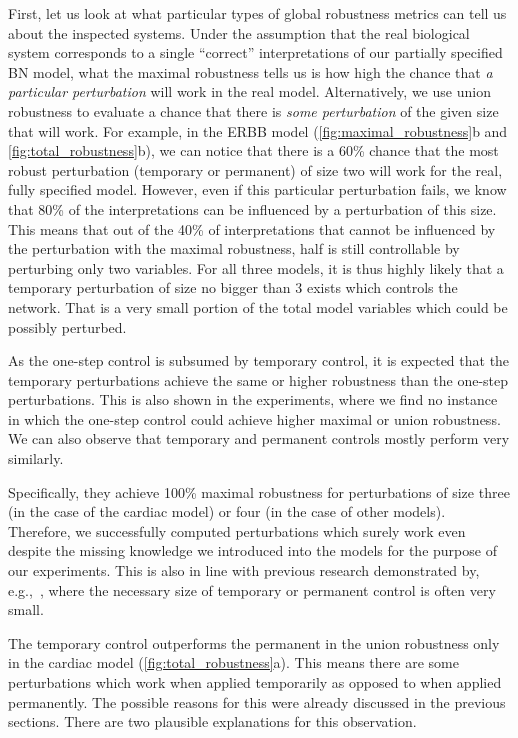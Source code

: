First, let us look at what particular types of global robustness metrics can tell us about the inspected systems. Under the assumption that the real biological system corresponds to a single ``correct'' interpretations of our partially specified BN model, what the maximal robustness tells us is how high the chance that \emph{a particular perturbation} will work in the real model. Alternatively, we use union robustness to evaluate a chance that there is \emph{some perturbation} of the given size that will work. For example, in the ERBB model (\autoref{fig:maximal_robustness}b and \autoref{fig:total_robustness}b), we can notice that there is a 60\% chance that the most robust perturbation (temporary or permanent) of size two will work for the real, fully specified model. However, even if this particular perturbation fails, we know that 80\% of the interpretations can be influenced by a perturbation of this size. This means that out of the 40\% of interpretations that cannot be influenced by the perturbation with the maximal robustness, half is still controllable by perturbing only two variables. For all three models, it is thus highly likely that a temporary perturbation of size no bigger than 3 exists which controls the network. That is a very small portion of the total model variables which could be possibly perturbed.

As the one-step control is subsumed by temporary control, it is expected that the temporary perturbations achieve the same or higher robustness than the one-step perturbations. This is also shown in the experiments, where we find no instance in which the one-step control could achieve higher maximal or union robustness. We can also observe that temporary and permanent controls mostly perform very similarly. 

Specifically, they achieve 100\% maximal robustness for perturbations of size three (in the case of the cardiac model) or four (in the case of other models). Therefore, we successfully computed perturbations which surely work even despite the missing knowledge we introduced into the models for the purpose of our experiments. This is also in line with previous research demonstrated by, e.g.,~\cite{Su2019CMSB, Su2020}, where the necessary size of temporary or permanent control is often very small.

The temporary control outperforms the permanent in the union robustness only in the cardiac model (\autoref{fig:total_robustness}a). This means there are some perturbations which work when applied temporarily as opposed to when applied permanently. The possible reasons for this were already discussed in the previous sections. There are two plausible explanations for this observation.

